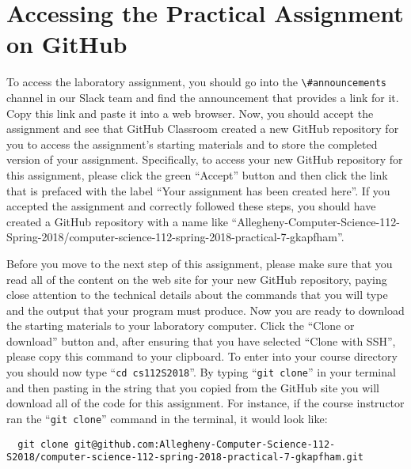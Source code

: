 \documentclass[11pt]{article}
\newcommand{\command}[1]{``\lstinline{#1}''}
\newcommand{\channel}[1]{\lstinline{#1}}
\begin{document}
\section*{Accessing the Practical Assignment on GitHub}

To access the laboratory assignment, you should go into the
\channel{\#announcements} channel in our Slack team and find the announcement
that provides a link for it. Copy this link and paste it into a web browser.
Now, you should accept the assignment and see that GitHub Classroom created a
new GitHub repository for you to access the assignment's starting materials and
to store the completed version of your assignment. Specifically, to access your
new GitHub repository for this assignment, please click the green ``Accept''
button and then click the link that is prefaced with the label ``Your assignment
has been created here''. If you accepted the assignment and correctly followed
these steps, you should have created a GitHub repository with a name like
``Allegheny-Computer-Science-112-Spring-2018/computer-science-112-spring-2018-practical-7-gkapfham''.


Before you move to the next step of this assignment, please make sure that you
read all of the content on the web site for your new GitHub repository, paying
close attention to the technical details about the commands that you will type
and the output that your program must produce. Now you are ready to download the
starting materials to your laboratory computer. Click the ``Clone or download''
button and, after ensuring that you have selected ``Clone with SSH'', please
copy this command to your clipboard. To enter into your course directory you
should now type \command{cd cs112S2018}. By typing \command{git clone} in your
terminal and then pasting in the string that you copied from the GitHub site you
will download all of the code for this assignment. For instance, if the course
instructor ran the \command{git clone} command in the terminal, it would look
like:

\begin{lstlisting}
  git clone git@github.com:Allegheny-Computer-Science-112-S2018/computer-science-112-spring-2018-practical-7-gkapfham.git
\end{lstlisting}
\end{document}

